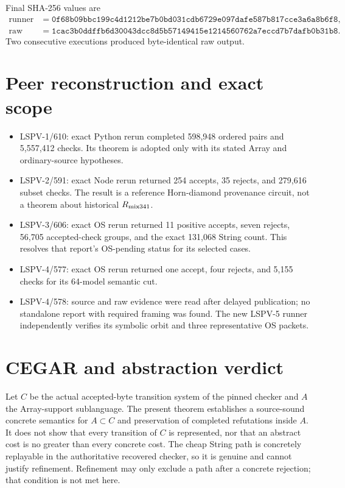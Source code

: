 \documentclass[11pt]{article}
\begin{document}
Final SHA-256 values are
\begin{align*}
\text{runner} &=
\texttt{0f68b09bbc199c4d1212be7b0bd031cdb6729e097dafe587b817cce3a6a8b6f8},\\
\text{raw} &=
\texttt{1cac3b0ddffb6d30043dcc8d5b57149415e1214560762a7eccd7b7dafb0b31b8}.
\end{align*}
Two consecutive executions produced byte-identical raw output.

\section*{Peer reconstruction and exact scope}
\begin{itemize}
\item LSPV-1/610: exact Python rerun completed 598,948 ordered pairs and
5,557,412 checks.  Its theorem is adopted only with its stated Array and
ordinary-source hypotheses.
\item LSPV-2/591: exact Node rerun returned 254 accepts, 35 rejects, and
279,616 subset checks.  The result is a reference Horn-diamond provenance
circuit, not a theorem about historical $R_{\rm mix341}$.
\item LSPV-3/606: exact OS rerun returned 11 positive accepts, seven rejects,
56,705 accepted-check groups, and the exact 131,068 String count.  This resolves
that report's OS-pending status for its selected cases.
\item LSPV-4/577: exact OS rerun returned one accept, four rejects, and 5,155
checks for its 64-model semantic cut.
\item LSPV-4/578: source and raw evidence were read after delayed publication;
no standalone report with required framing was found.  The new LSPV-5 runner
independently verifies its symbolic orbit and three representative OS packets.
\end{itemize}

\section*{CEGAR and abstraction verdict}
Let $C$ be the actual accepted-byte transition system of the pinned checker and
$A$ the Array-support sublanguage.  The present theorem establishes a
source-sound concrete semantics for $A\subset C$ and preservation of completed
refutations inside $A$.  It does not show that every transition of $C$ is
represented, nor that an abstract cost is no greater than every concrete cost.
The cheap String path is concretely replayable in the authoritative recovered
checker, so it is genuine and cannot justify refinement.  Refinement may only
exclude a path after a concrete rejection; that condition is not met here.
\end{document}
